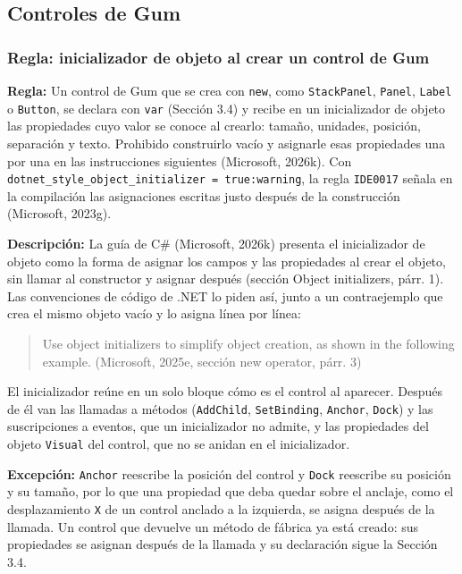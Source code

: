 \subsection{Controles de Gum}

\subsubsection{Regla: inicializador de objeto al crear un control de Gum}

\textbf{Regla:} Un control de Gum que se crea con \texttt{new}, como \texttt{StackPanel}, \texttt{Panel}, \texttt{Label} o \texttt{Button}, se declara con \texttt{var} (Sección 3.4) y recibe en un inicializador de objeto las propiedades cuyo valor se conoce al crearlo: tamaño, unidades, posición, separación y texto. Prohibido construirlo vacío y asignarle esas propiedades una por una en las instrucciones siguientes (Microsoft, 2026k). Con \texttt{dotnet\_style\_object\_initializer = true:warning}, la regla \texttt{IDE0017} señala en la compilación las asignaciones escritas justo después de la construcción (Microsoft, 2023g).

\textbf{Descripción:} La guía de C\# (Microsoft, 2026k) presenta el inicializador de objeto como la forma de asignar los campos y las propiedades al crear el objeto, sin llamar al constructor y asignar después (sección Object initializers, párr. 1). Las convenciones de código de .NET lo piden así, junto a un contraejemplo que crea el mismo objeto vacío y lo asigna línea por línea:
\begin{quote}
Use object initializers to simplify object creation, as shown in the following example. (Microsoft, 2025e, sección new operator, párr. 3)
\end{quote}
\noindent El inicializador reúne en un solo bloque cómo es el control al aparecer. Después de él van las llamadas a métodos (\texttt{AddChild}, \texttt{SetBinding}, \texttt{Anchor}, \texttt{Dock}) y las suscripciones a eventos, que un inicializador no admite, y las propiedades del objeto \texttt{Visual} del control, que no se anidan en el inicializador.

\textbf{Excepción:} \texttt{Anchor} reescribe la posición del control y \texttt{Dock} reescribe su posición y su tamaño, por lo que una propiedad que deba quedar sobre el anclaje, como el desplazamiento \texttt{X} de un control anclado a la izquierda, se asigna después de la llamada. Un control que devuelve un método de fábrica ya está creado: sus propiedades se asignan después de la llamada y su declaración sigue la Sección 3.4.

